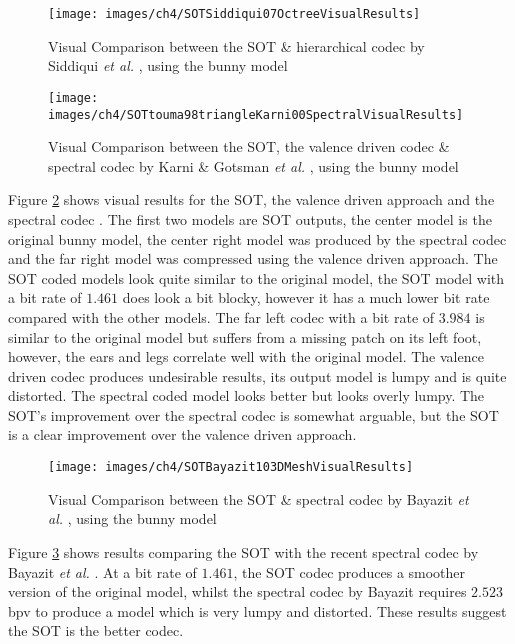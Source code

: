 \begin{figure}[!h]
\centering
\texttt{[image: images/ch4/SOTSiddiqui07OctreeVisualResults]}
\caption{Visual Comparison between the SOT \& hierarchical codec by Siddiqui \textit{et al.} \cite{Siddiqui07Octree}, using the bunny model}
\label{SOTSiddiqui07OctreeVisualResults}
\end{figure}

\begin{figure}[!h]
\centering
\texttt{[image: images/ch4/SOTtouma98triangleKarni00SpectralVisualResults]}
\caption{Visual Comparison between the SOT, the valence driven codec \cite{touma98triangle} \& spectral codec by Karni \& Gotsman \textit{et al.} \cite{Karni00Spectral}, using the bunny model}
\label{SOTtouma98triangleKarni00SpectralVisualResults}
\end{figure}

Figure \ref{SOTtouma98triangleKarni00SpectralVisualResults} shows visual results for the SOT, the valence driven approach \cite{touma98triangle} and the spectral codec \cite{Karni00Spectral}. The first two models are SOT outputs, the center model is the original bunny model, the center right model was produced by the spectral codec and the far right model was compressed using the valence driven approach. The SOT coded models look quite similar to the original model, the SOT model with a bit rate of $1.461$ does look a bit blocky, however it has a much lower bit rate compared with the other models. The far left codec with a bit rate of $3.984$ is similar to the original model but suffers from a missing patch on its left foot, however, the ears and legs correlate well with the original model. The valence driven codec produces undesirable results, its output model is lumpy and is quite distorted. The spectral coded model looks better but looks overly lumpy. The SOT's improvement over the spectral codec is somewhat arguable, but the SOT is a clear improvement over the valence driven approach.

\begin{figure}[!h]
\centering
\texttt{[image: images/ch4/SOTBayazit103DMeshVisualResults]}
\caption{Visual Comparison between the SOT \& spectral codec by Bayazit \textit{et al.} \cite{Bayazit103DMesh}, using the bunny model}
\label{SOTBayazit103DMeshVisualResults}
\end{figure}

Figure \ref{SOTBayazit103DMeshVisualResults} shows results comparing the SOT with the recent spectral codec by Bayazit \textit{et al.} \cite{Bayazit103DMesh}. At a bit rate of $1.461$, the SOT codec produces a smoother version of the original model, whilst the spectral codec by Bayazit requires $2.523$ bpv to produce a model which is very lumpy and distorted. These results suggest the SOT is the better codec.

